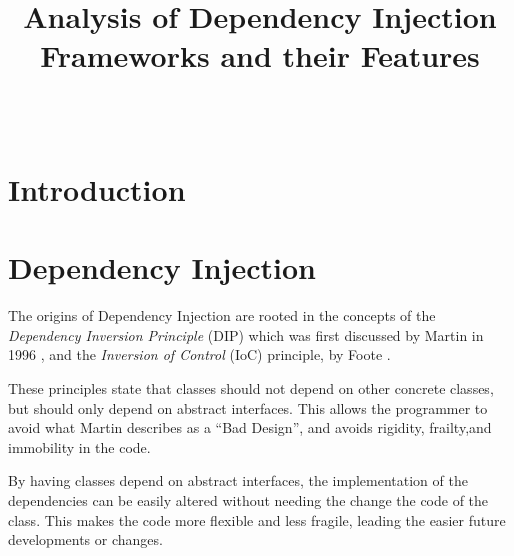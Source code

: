 \documentclass[12pt,twocolumn]{IEEEtran}
\begin{document}
	\onecolumn
	\title{Analysis of Dependency Injection Frameworks and their Features}
	
	\author{\\
		}
	
	\maketitle
	
	\begin{abstract}
		
	\end{abstract}

\thispagestyle{empty}
\setcounter{page}{0}
\twocolumn
\clearpage

\section{Introduction}

\section{Dependency Injection}

The origins of Dependency Injection are rooted in the concepts of the \textit{Dependency Inversion Principle} (DIP) which was first discussed by Martin in 1996 \cite{martin1996}, and the \textit{Inversion of Control} (IoC) principle, by Foote \cite{foote1988}. 



These principles state that classes should not depend on other concrete classes, but should only depend on abstract interfaces. This allows the programmer to avoid what Martin describes as a ``Bad Design'', and avoids rigidity, frailty,and immobility in the code.

By having classes depend on abstract interfaces, the implementation of the dependencies can be easily altered without needing the change the code of the class. This makes the code more flexible and less fragile, leading the easier future developments or changes. 
\end{document}
